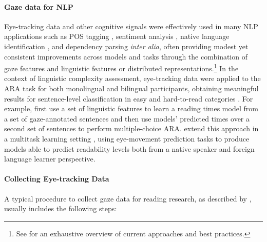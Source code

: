 \documentclass[a4paper, nobind]{templates/ociamthesis}
\begin{document}
\vspace{-12pt}

\paragraph{Gaze data for NLP} Eye-tracking data and other cognitive signals were effectively used in many NLP applications such as POS tagging \autocite{barrett-etal-2016-weakly}, sentiment analysis \autocite{mishra-etal-2017-learning}, native language identification \autocite{berzak-etal-2018-assessing}, and dependency parsing \autocite{strzyz-etal-2019-towards} \emph{inter alia}, often providing modest yet consistent improvements across models and tasks through the combination of gaze features and linguistic features or distributed representations.\footnote{See \textcite{hollenstein-etal-2020-towards} for an exhaustive overview of current approaches and best practices.} In the context of linguistic complexity assessment, eye-tracking data were applied to the ARA task for both monolingual and bilingual participants, obtaining meaningful results for sentence-level classification in easy and hard-to-read categories \autocites{vasishth-etal-2013-what}{ambati-etal-2016-assessing}. For example, \textcite{singh-etal-2016-quantifying} first use a set of linguistic features to learn a reading times model from a set of gaze-annotated sentences and then use models' predicted times over a second set of sentences to perform multiple-choice ARA. \textcite{gonzalez-garduno-sogaard-2018-learning} extend this approach in a multitask learning setting \autocites{caruana-1997-multitask}{ruder-2017-overview}, using eye-movement prediction tasks to produce models able to predict readability levels both from a native speaker and foreign language learner perspective.

\vspace{-12pt}

\paragraph{Collecting Eye-tracking Data} A typical procedure to collect gaze data for reading research, as described by \textcite{schotter-2020-eyetracking}, usually includes the following steps:
\end{document}
